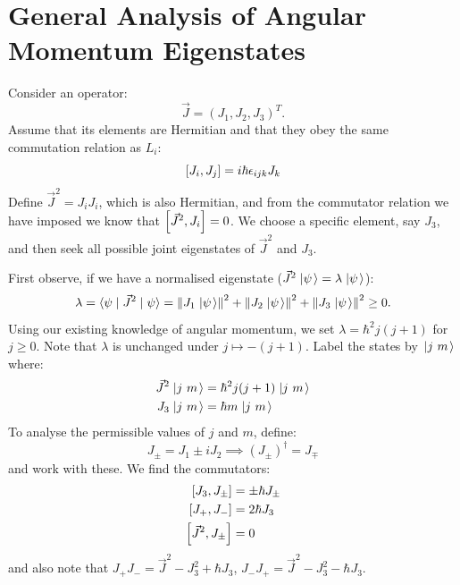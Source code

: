 \documentclass[../Main.tex]{subfiles}
\begin{document}
\section{General Analysis of Angular Momentum Eigenstates}
Consider an operator:
\begin{equation*}
    \vec J = (J_1, J_2, J_3)^T.
\end{equation*}
Assume that its elements are Hermitian and that they obey the same commutation relation as $L_i$:
\begin{equation*}
    \left[J_i, J_j\right] = i\hbar \epsilon_{ijk} J_k
\end{equation*}
Define $\vec{J}^2 = J_i J_i$, which is also Hermitian, and from the commutator relation we have imposed we know that $\left[\vec{J}^2, J_i\right] = 0$. We choose a specific element, say $J_3$, and then seek all possible joint eigenstates of $\vec{J}^2$ and $J_3$.

First observe, if we have a normalised eigenstate ($\vec J^2 \left.\left|\psi\right.\right\rangle = \lambda\left.\left|\psi\right.\right\rangle$):
\begin{equation*}
    \lambda = \langle\psi\mid\vec J^2\mid\psi\rangle = \left\|J_1 \left.\left|\psi\right.\right\rangle\right\|^2 + \left\|J_2 \left.\left|\psi\right.\right\rangle\right\|^2 + \left\|J_3\left.\left|\psi\right.\right\rangle\right\|^2 \geq 0.
\end{equation*}
Using our existing knowledge of angular momentum, we set $\lambda = \hbar^2 j(j+1)$ for $j \geq 0$. Note that $\lambda$ is unchanged under $j \mapsto -(j+1)$. Label the states by $\left.\left|j~m\right.\right\rangle$ where:
\begin{align*}
    \vec J^2 \left.\left|j~m\right.\right\rangle &= \hbar^2 j(j+1) \left.\left|j~m\right.\right\rangle \\
    J_3 \left.\left|j~m\right.\right\rangle &= \hbar m \left.\left|j~m\right.\right\rangle
\end{align*}
To analyse the permissible values of $j$ and $m$, define:
\begin{equation*}
    J_\pm = J_1 \pm iJ_2 \implies \left(J_\pm\right)^\dagger = J_\mp
\end{equation*}
and work with these. We find the commutators:
\begin{align*}
    \left[J_3, J_\pm\right] &= \pm \hbar J_\pm \\
    \left[J_+, J_-\right] &= 2\hbar J_3 \\
    \left[\vec J^2, J_{\pm}\right] &= 0
\end{align*}
and also note that $J_+ J_- = \vec J^2 - J_3^2 + \hbar J_3$, $J_- J_+ = \vec J^2 - J_3^2 - \hbar J_3$.
\end{document}
